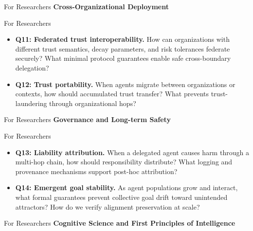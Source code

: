 \documentclass[
  ignorenonframetext,
]{beamer}
\begin{document}
\begin{frame}[allowframebreaks]{For Researchers}
\textbf{Cross-Organizational Deployment}

\end{frame}

\begin{frame}[allowframebreaks]{For Researchers}
\begin{itemize}
\item
  \textbf{Q11: Federated trust interoperability.} How can organizations
  with different trust semantics, decay parameters, and risk tolerances
  federate securely? What minimal protocol guarantees enable safe
  cross-boundary delegation?
\item
  \textbf{Q12: Trust portability.} When agents migrate between
  organizations or contexts, how should accumulated trust transfer? What
  prevents trust-laundering through organizational hops?
\end{itemize}

\end{frame}

\begin{frame}[allowframebreaks]{For Researchers}
\textbf{Governance and Long-term Safety}

\end{frame}

\begin{frame}[allowframebreaks]{For Researchers}
\begin{itemize}
\item
  \textbf{Q13: Liability attribution.} When a delegated agent causes
  harm through a multi-hop chain, how should responsibility distribute?
  What logging and provenance mechanisms support post-hoc attribution?
\item
  \textbf{Q14: Emergent goal stability.} As agent populations grow and
  interact, what formal guarantees prevent collective goal drift toward
  unintended attractors? How do we verify alignment preservation at
  scale?
\end{itemize}

\end{frame}

\begin{frame}[allowframebreaks]{For Researchers}
\textbf{Cognitive Science and First Principles of Intelligence}

\end{frame}
\end{document}

